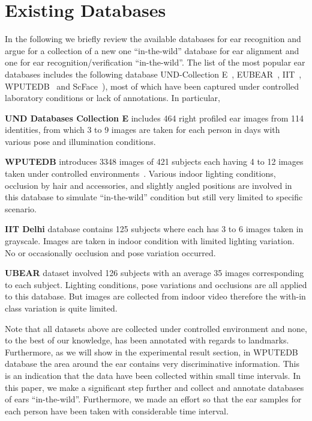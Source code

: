 \section{Existing Databases}

In the following we briefly review the available databases for ear recognition and argue for a collection of a new one ``in-the-wild'' database for ear alignment and one for ear recognition/verification ``in-the-wild''. 
The list of the most popular ear databases includes the following database UND-Collection E~\cite{UNDE}, EUBEAR~\cite{raposo2011ubear}, IIT~\cite{kumar2012automated}, WPUTEDB~\cite{frejlichowski2010west} and ScFace~\cite{grgic2011scface}), most of which have been captured under controlled laboratory conditions or lack of annotations. In particular, 

\noindent\textbf{UND Databases Collection E} includes 464 right profiled ear images from 114 identities, from which 3 to 9 images are taken for each person in days with various pose and illumination conditions.

\noindent\textbf{WPUTEDB} introduces 3348 images of 421 subjects each having 4 to 12 images taken under controlled environments~\cite{frejlichowski2010west}. Various indoor lighting conditions, occlusion by hair and accessories, and slightly angled positions are involved in this database to simulate ``in-the-wild'' condition but still very limited to specific scenario. 

\noindent\textbf{IIT Delhi} database contains 125 subjects where each has 3 to 6 images taken in grayscale. Images are taken in indoor condition with limited lighting variation. No or occasionally occlusion and pose variation occurred.

\noindent\textbf{UBEAR} dataset involved 126 subjects with an average 35 images corresponding to each subject. Lighting conditions, pose variations and occlusions are all applied to this database. But images are collected from indoor video therefore the with-in class variation is quite limited.

Note that all datasets above are collected under controlled environment and none, to the best of our knowledge, has been annotated with regards to landmarks. Furthermore, as we will show in the experimental result section, in WPUTEDB database the area around the ear contains very discriminative information. This is an indication that the data have been collected within small time intervals. In this paper, we make a significant step further and collect and annotate databases of ears ``in-the-wild''.  Furthermore, we made an effort so that the ear samples for each person have been taken with considerable time interval. 

